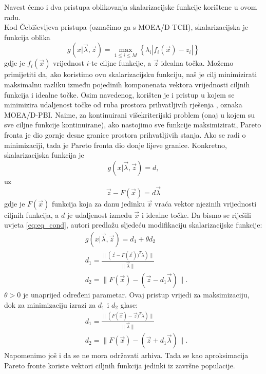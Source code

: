 \documentclass[times, utf8, zavrsni, numeric]{fer}
\newcommand{\norm}[1]{\lVert#1\rVert}
\begin{document}
Navest ćemo i dva pristupa oblikovanja skalarizacijske funkcije korištene u ovom radu.\\
Kod Čebiševljeva pristupa (označimo ga s MOEA/D-{TCH}), skalarizacijska je funkcija oblika
\begin{equation*}
g(x\vert\vec{\lambda},\vec{z}) = \max_{1\leq i \leq M}{\left\lbrace \lambda_i\left\vert f_i(\vec{x}) - z_i\right\vert\right\rbrace} 
\end{equation*} 
gdje je $f_i(\vec{x})$ vrijednost $i$-te ciljne funkcije, a $\vec{z}$ idealna točka. Možemo primijetiti da, ako koristimo ovu skalarizacijsku funkciju, naš je cilj minimizirati maksimalnu razliku između pojedinih komponenata vektora vrijednosti ciljnih funkcija i idealne točke. Osim navedenog, korišten je i pristup u kojem se minimizira udaljenost točke od ruba prostora prihvatljivih rješenja , oznaka MOEA/D-PBI. Naime, za kontinuirani višekriterijski problem (onaj u kojem su sve ciljne funkcije kontinuirane), ako nastojimo sve funkcije maksimizirati, Pareto fronta je dio gornje desne granice prostora prihvatljivih stanja. Ako se radi o minimizaciji, tada je Pareto fronta dio donje lijeve granice. Konkretno, skalarizacijska funkcija je 
\begin{equation*}
g(x\vert\vec{\lambda},\vec{z}) = d,
\end{equation*}
uz
\begin{equation}
\label{eq:eq_cond}
\vec{z} - F(\vec{x}) = d\vec{\lambda}
\end{equation} 	
gdje je $F(\vec{x})$ funkcija koja za danu jedinku $\vec{x}$ vraća vektor njezinih vrijednosti ciljnih funkcija, a $d$ je udaljenost između $\vec{x}$ i idealne točke. Da bismo se riješili uvjeta \ref{eq:eq_cond}, autori predlažu sljedeću modifikaciju skalarizacijske funkcije:
\begin{align*}
&g(x\vert\vec{\lambda},\vec{z}) = d_1 + \theta d_2\\
&d_1 = \frac{\norm{\left(\vec{z} - F(\vec{x}))^T\lambda\right)}}{\norm{\vec{\lambda}}}\\
&d_2 = \norm{F(\vec{x}) - (\vec{z} - d_1\vec{\lambda})}.
\end{align*}
$\theta > 0$ je unaprijed određeni parametar. Ovaj pristup vrijedi za maksimizaciju, dok za minimizaciju izrazi za $d_1$ i $d_2$ glase:
\begin{align*}
&d_1 = \frac{\norm{\left(F(\vec{x}) - \vec{z})^T\lambda\right)}}{\norm{\vec{\lambda}}}\\
&d_2 = \norm{F(\vec{x}) - (\vec{z} + d_1\vec{\lambda})}.
\end{align*}
Napomenimo još i da se ne mora održavati arhiva. Tada se kao aproksimacija Pareto fronte koriste vektori ciljnih funkcija jedinki iz završne populacije.  
\end{document}
